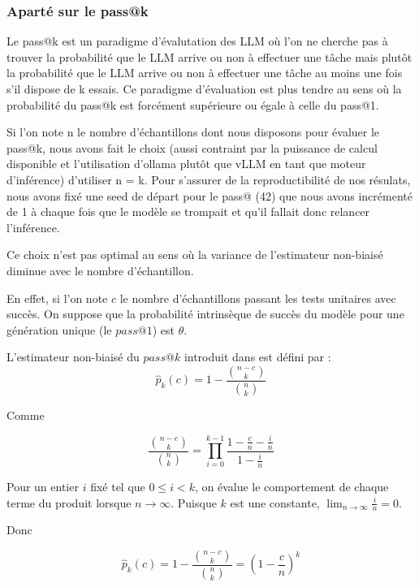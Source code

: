 \documentclass[11pt, a4paper]{article}
\begin{document}
\subsubsection{Aparté sur le pass@k}\label{sec:pass@}

Le pass@k est un paradigme d'évalutation des LLM où l'on ne cherche pas à trouver la probabilité que le LLM arrive ou non à effectuer une tâche mais plutôt la probabilité que le LLM arrive ou non à effectuer une tâche au moins une fois s'il dispose de k essais. Ce paradigme d'évaluation est plus tendre au sens où la probabilité du pass@k est forcément supérieure ou égale à celle du pass@1.

Si l'on note n le nombre d'échantillons dont nous disposons pour évaluer le pass@k, nous avons fait le choix (aussi contraint par la puissance de calcul disponible et l'utilisation d'ollama plutôt que vLLM en tant que moteur d'inférence) d'utiliser n = k. Pour s'assurer de la reproductibilité de nos résulats, nous avons fixé une seed de départ pour le pass@ (42) que nous avons incrémenté de 1 à chaque fois que le modèle se trompait et qu'il fallait donc relancer l'inférence.

Ce choix n'est pas optimal au sens où la variance de l'estimateur non-biaisé diminue avec le nombre d'échantillon.

En effet, si l'on note $c$ le nombre d'échantillons passant les tests unitaires avec succès. On suppose que la probabilité intrinsèque de succès du modèle pour une génération unique (le $pass@1$) est $\theta$.

L'estimateur non-biaisé du $pass@k$ introduit dans \cite{chen2021evaluatinglargelanguagemodels} est défini par :
\begin{equation}
    \hat{p}_k(c) = 1 - \frac{\binom{n-c}{k}}{\binom{n}{k}}
\end{equation}

Comme 

\begin{equation}
    \frac{\binom{n-c}{k}}{\binom{n}{k}} = \prod_{i=0}^{k-1} \frac{1 - \frac{c}{n} - \frac{i}{n}}{1 - \frac{i}{n}}
\end{equation}

Pour un entier $i$ fixé tel que $0 \leq i < k$, on évalue le comportement de chaque terme du produit lorsque $n \to \infty$. Puisque $k$ est une constante, $\lim_{n \to \infty} \frac{i}{n} = 0$. 

Donc 

\begin{equation}
    \hat{p}_k(c) = 1 - \frac{\binom{n-c}{k}}{\binom{n}{k}} = (1 - \frac{c}{n})^{k}
\end{equation}
\end{document}
